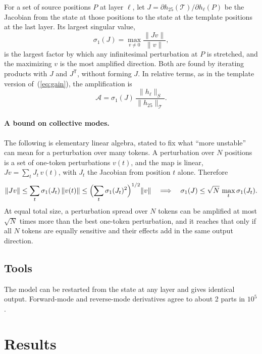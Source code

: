 \documentclass[11pt]{article}
\newcommand{\cT}{\mathcal{T}}
\newcommand{\nrm}[2]{\lVert #1\rVert_{#2}}
\begin{document}
For a set of source positions $P$ at layer $\ell$, let $J=\partial h_{25}(\cT)/\partial h_\ell(P)$ be the Jacobian from the state at those positions to the state at the template positions at the last layer. Its largest singular value,
\begin{equation}
\sigma_1(J)=\max_{v\ne 0}\frac{\lVert Jv\rVert}{\lVert v\rVert},
\end{equation}
is the largest factor by which any infinitesimal perturbation at $P$ is stretched, and the maximizing $v$ is the most amplified direction. Both are found by iterating products with $J$ and $J^{\mathsf T}$, without forming $J$. In relative terms, as in the template version of~(\ref{eq:gain}), the amplification is
\begin{equation}
\mathcal{A}=\sigma_1(J)\,\frac{\nrm{h_\ell}{S}}{\nrm{h_{25}}{\cT}} .
\label{eq:amp}
\end{equation}

\paragraph{A bound on collective modes.} The following is elementary linear algebra, stated to fix what ``more unstable'' can mean for a perturbation over many tokens. A perturbation over $N$ positions is a set of one-token perturbations $v(t)$, and the map is linear, $Jv=\sum_t J_t\,v(t)$, with $J_t$ the Jacobian from position $t$ alone. Therefore
\begin{equation}
\lVert Jv\rVert\le\sum_t\sigma_1(J_t)\,\lVert v(t)\rVert\le\Bigl(\sum_t\sigma_1(J_t)^2\Bigr)^{1/2}\lVert v\rVert
\quad\Longrightarrow\quad
\sigma_1(J)\le\sqrt{N}\,\max_t\sigma_1(J_t) .
\label{eq:bound}
\end{equation}
At equal total size, a perturbation spread over $N$ tokens can be amplified at most $\sqrt N$ times more than the best one-token perturbation, and it reaches that only if all $N$ tokens are equally sensitive and their effects add in the same output direction.

\subsection{Tools}

The model can be restarted from the state at any layer and gives identical output. Forward-mode and reverse-mode derivatives agree to about 2 parts in $10^5$.

\section{Results}
\label{sec:results}
\end{document}
